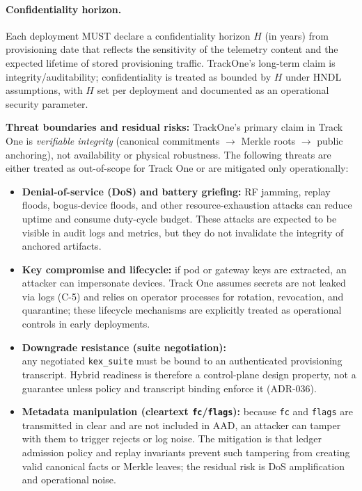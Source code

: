 \paragraph{Confidentiality horizon.}
Each deployment MUST declare a confidentiality horizon $H$ (in years) from provisioning date that reflects the sensitivity of the telemetry content and the expected lifetime of stored provisioning traffic.
TrackOne’s long-term claim is integrity/auditability; confidentiality is treated as bounded by $H$ under HNDL assumptions, with $H$ set per deployment and documented as an operational security parameter.

\textbf{Threat boundaries and residual risks:}
TrackOne’s primary claim in Track One is \emph{verifiable integrity} (canonical commitments $\rightarrow$ Merkle roots
$\rightarrow$ public anchoring), not availability or physical robustness.
The following threats are either treated as
out-of-scope for Track One or are mitigated only operationally:

\begin{itemize}[nosep]
    \item \textbf{Denial-of-service (DoS) and battery griefing:} RF jamming, replay floods, bogus-device floods, and other
    resource-exhaustion attacks can reduce uptime and consume duty-cycle budget.
    These attacks are expected to be visible
    in audit logs and metrics, but they do not invalidate the integrity of anchored artifacts.
    \item \textbf{Key compromise and lifecycle:} if pod or gateway keys are extracted, an attacker can impersonate devices.
    Track One assumes secrets are not leaked via logs (C-5) and relies on operator processes for rotation, revocation, and
    quarantine; these lifecycle mechanisms are explicitly treated as operational controls in early deployments.
    \item \textbf{Downgrade resistance (suite negotiation):}\\ any negotiated \texttt{kex\_suite} must be bound to an
    authenticated provisioning transcript.
    Hybrid readiness is therefore a
    control-plane design property, not a guarantee unless policy and transcript binding enforce it (\ac{ADR}-036).
    \item \textbf{Metadata manipulation (cleartext \texttt{fc}/\texttt{flags}):} because \texttt{fc} and \texttt{flags} are
    transmitted in clear and are not included in \ac{AAD}, an attacker can tamper with them to trigger rejects or log noise.
    The mitigation is that ledger admission policy and replay invariants prevent such tampering from creating valid
    canonical facts or Merkle leaves; the residual risk is DoS amplification and operational noise.
\end{itemize}

